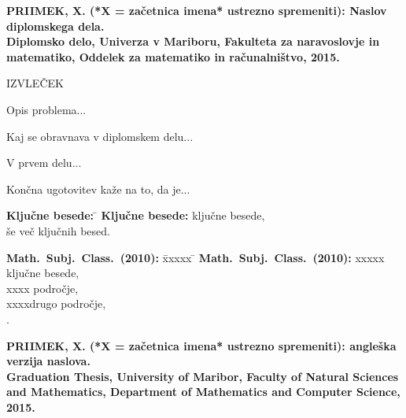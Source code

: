 \textbf{PRIIMEK, X. (*X = za\v cetnica imena* ustrezno spremeniti): Naslov diplomskega dela.\\
    Diplomsko delo, Univerza v Mariboru, Fakulteta za naravoslovje in \-ma\-te\-ma\-ti\-ko,
    Oddelek za matematiko in ra\v cunalni\v stvo, 2015.}\\

  \vspace{1.5cm}

  \large

  IZVLE\v CEK

  \small

  \vspace{1.5cm}
  \begin{sloppypar}
    Opis problema...
  \end{sloppypar}
  \begin{sloppypar}
    Kaj se obravnava v diplomskem delu...
  \end{sloppypar}
  \begin{sloppypar}
    V prvem delu...
  \end{sloppypar}
  \begin{sloppypar}
    Kon\v cna ugotovitev ka\v ze na to, da je...
  \end{sloppypar}

  \vfill

  \begin{tabbing}
    \textbf{Klju\v cne besede:} \=\kill
    \textbf{Klju\v cne besede:} \>klju\v cne besede,\\
    \>\v se ve\v c klju\v cnih besed.\\
  \end{tabbing}

  \begin{tabbing}
    \textbf{Math.\ Subj.\ Class.\ (2010):} \=xxxxx \=\kill
    \textbf{Math.\ Subj.\ Class.\ (2010):} \>xxxxx klju\v cne besede,\\
    \>xxxx podro\v cje,\\
    \>xxxxdrugo podro\v cje,\\\>.\\
  \end{tabbing}

  \newpage
  \textbf{PRIIMEK, X. (*X = za\v cetnica imena* ustrezno spremeniti): angle\v ska verzija naslova.\\
    Graduation Thesis, University of Maribor, Faculty of Natural Sciences and \-Ma\-the\-ma\-tics,
    Department of Mathematics and Computer Science, 2015.}\\


